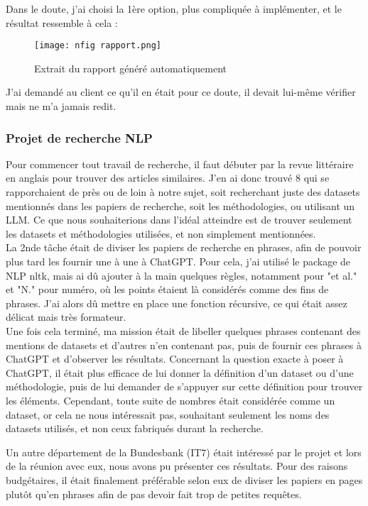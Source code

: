 Dans le doute, j'ai choisi la 1ère option, plus compliquée à implémenter, et le résultat ressemble à cela :

\begin{figure}[H]
    \centering
    \texttt{[image: nfig rapport.png]}
    \caption{Extrait du rapport généré automatiquement}
\end{figure}

J'ai demandé au client ce qu'il en était pour ce doute, il devait lui-même vérifier mais ne m'a jamais redit.

\subsubsection{Projet de recherche NLP}

Pour commencer tout travail de recherche, il faut débuter par la revue littéraire en anglais pour trouver des articles similaires. 
J'en ai donc trouvé 8 qui se rapporchaient de près ou de loin à notre sujet, soit recherchant juste des datasets mentionnés dans les papiers de recherche, soit les méthodologies, ou utilisant un LLM.
Ce que nous souhaiterions dans l'idéal atteindre est de trouver seulement les datasets et méthodologies utilisées, et non simplement mentionnées.
\\

La 2nde tâche était de diviser les papiers de recherche en phrases, afin de pouvoir plus tard les fournir une à une à ChatGPT. 
Pour cela, j'ai utilisé le package de NLP nltk, mais ai dû ajouter à la main quelques règles, notamment pour "et al." et "N." pour numéro, où les points étaient là considérés comme des fins de phrases.
J'ai alors dû mettre en place une fonction récursive, ce qui était assez délicat mais très formateur.
\\

Une fois cela terminé, ma mission était de libeller quelques phrases contenant des mentions de datasets et d'autres n'en contenant pas, puis de fournir ces phrases à ChatGPT et d'observer les résultats.
Concernant la question exacte à poser à ChatGPT, il était plus efficace de lui donner la définition d'un dataset ou d'une méthodologie, puis de lui demander de s'appuyer sur cette définition pour trouver les éléments.
Cependant, toute suite de nombres était considérée comme un dataset, or cela ne nous intéressait pas, souhaitant seulement les noms des datasets utilisés, et non ceux fabriqués durant la recherche.

Un autre département de la Bundesbank (IT7) était intéressé par le projet et lors de la réunion avec eux, nous avons pu présenter ces résultats.
Pour des raisons budgétaires, il était finalement préférable selon eux de diviser les papiers en pages plutôt qu'en phrases afin de pas devoir fait trop de petites requêtes.

